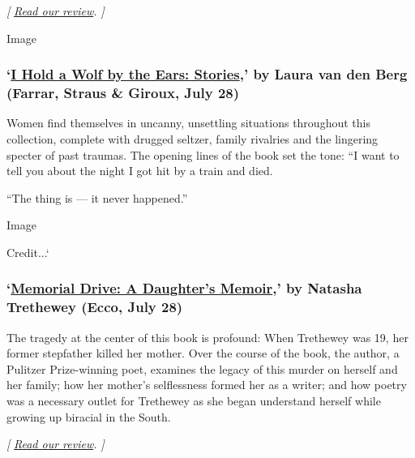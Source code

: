 \emph{{[}}
\href{https://www.nytimes.com/2020/07/17/books/review/hamnet-maggie-ofarrell.html}{\emph{Read
our review}}\emph{. {]}}

Image

\hypertarget{i-hold-a-wolf-by-the-ears-stories-by-laura-van-den-berg-farrar-straus--giroux-july-28}{%
\subsubsection{\texorpdfstring{`\href{https://us.macmillan.com/books/9780374102098}{I
Hold a Wolf by the Ears: Stories},' by Laura van den Berg (Farrar,
Straus \& Giroux, July
28)}{`I Hold a Wolf by the Ears: Stories,' by Laura van den Berg (Farrar, Straus \& Giroux, July 28)}}\label{i-hold-a-wolf-by-the-ears-stories-by-laura-van-den-berg-farrar-straus--giroux-july-28}}

Women find themselves in uncanny, unsettling situations throughout this
collection, complete with drugged seltzer, family rivalries and the
lingering specter of past traumas. The opening lines of the book set the
tone: ``I want to tell you about the night I got hit by a train and
died.

``The thing is --- it never happened.''

Image

Credit...`

\hypertarget{memorial-drive-a-daughters-memoir-by-natasha-trethewey-ecco-july-28}{%
\subsubsection{\texorpdfstring{`\href{https://www.harpercollins.com/9780062248572/memorial-drive/}{Memorial
Drive: A Daughter's Memoir},' by Natasha Trethewey (Ecco, July
28)}{`Memorial Drive: A Daughter's Memoir,' by Natasha Trethewey (Ecco, July 28)}}\label{memorial-drive-a-daughters-memoir-by-natasha-trethewey-ecco-july-28}}

The tragedy at the center of this book is profound: When Trethewey was
19, her former stepfather killed her mother. Over the course of the
book, the author, a Pulitzer Prize-winning poet, examines the legacy of
this murder on herself and her family; how her mother's selflessness
formed her as a writer; and how poetry was a necessary outlet for
Trethewey as she began understand herself while growing up biracial in
the South.

\emph{{[}}
\href{https://www.nytimes.com/2020/07/27/books/review-memorial-drive-memoir-natasha-trethewey.html}{\emph{Read
our review}}\emph{. {]}}

